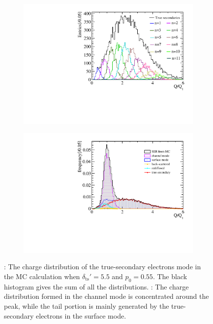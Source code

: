 \begin{figure}[!htbp]
	\begin{subfigure}{0.47\linewidth}
		\includegraphics[width=\textwidth]{PMTRelated/GTmodel/true_all.pdf}
		\caption{}
		\label{fig:true_n}
	\end{subfigure}
	\hfill
	\begin{subfigure}{0.47\linewidth}
		\includegraphics[width=\textwidth]{PMTRelated/GTmodel/allmode.pdf}
		\caption{}
		\label{fig:allmode}
	\end{subfigure}
	\caption{: The charge distribution of the true-secondary electrons mode
		in the MC calculation when $\delta_{\mathrm{ts}}'=5.5$ and $p_0=0.55$.
		The black histogram gives the sum of all the distributions.
		: The charge distribution formed in the channel mode is concentrated around the peak,
		while the tail portion is mainly generated by the true-secondary electrons in the surface mode.}
\end{figure}

